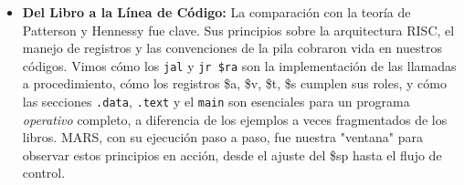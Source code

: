 \documentclass{article}
\begin{document}
\begin{itemize}
\begin{itemize}
    \end{itemize}
    \item \textbf{Del Libro a la Línea de Código:} La comparación con la teoría de Patterson y Hennessy fue clave. Sus principios sobre la arquitectura RISC, el manejo de registros y las convenciones de la pila cobraron vida en nuestros códigos. Vimos cómo los \texttt{jal} y \texttt{jr \$ra} son la implementación de las llamadas a procedimiento, cómo los registros \$a, \$v, \$t, \$s cumplen sus roles, y cómo las secciones \texttt{.data}, \texttt{.text} y el \texttt{main} son esenciales para un programa \textit{operativo} completo, a diferencia de los ejemplos a veces fragmentados de los libros. MARS, con su ejecución paso a paso, fue nuestra "ventana" para observar estos principios en acción, desde el ajuste del \$sp hasta el flujo de control.
\end{itemize}
\end{document}
